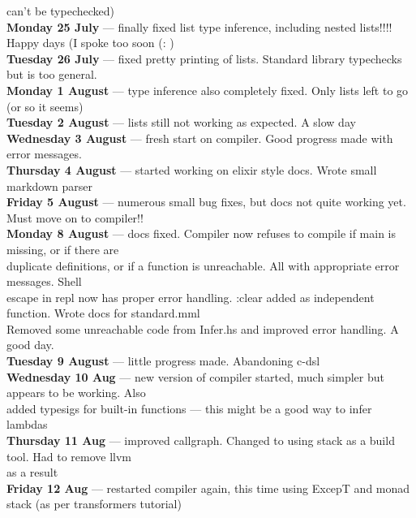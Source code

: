                   can't be typechecked) \\
\textbf{Monday 25 July}  --- finally fixed list type inference, including nested lists!!!! Happy days (I spoke too soon (: ) \\
\textbf{Tuesday 26 July}  --- fixed pretty printing of lists. Standard library typechecks but is too general. \\
\textbf{Monday 1 August}  --- type inference also completely fixed. Only lists left to go (or so it seems) \\
\textbf{Tuesday 2 August}  --- lists still not working as expected. A slow day \\
\textbf{Wednesday 3 August}  --- fresh start on compiler. Good progress made with error messages. \\
\textbf{Thursday 4 August}  --- started working on elixir style docs. Wrote small markdown parser \\
\textbf{Friday 5 August}  --- numerous small bug fixes, but docs not quite working yet. Must move on to compiler!! \\
\textbf{Monday 8 August}  --- docs fixed. Compiler now refuses to compile if main is missing, or if there are \\
                    duplicate definitions, or if a function is unreachable. All with appropriate error messages. Shell \\
                    escape in repl now has proper error handling. :clear added as independent function. Wrote docs for standard.mml \\
                    Removed some unreachable code from Infer.hs and improved error handling. A good day. \\
\textbf{Tuesday 9 August}  --- little progress made. Abandoning c-dsl \\
\textbf{Wednesday 10 Aug}  --- new version of compiler started, much simpler but appears to be working. Also \\
                   added typesigs for built-in functions  --- this might be a good way to infer \\
                   lambdas \\
\textbf{Thursday 11 Aug}  --- improved callgraph. Changed to using stack as a build tool. Had to remove llvm \\
                     as a result \\
\textbf{Friday 12 Aug}  --- restarted compiler again, this time using ExcepT and monad stack (as per transformers tutorial) \\
